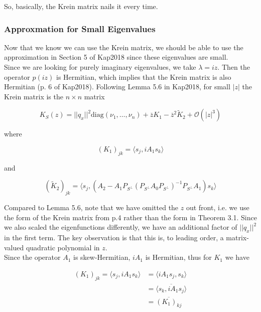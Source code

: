 \documentclass[12pt]{article}
\begin{document}
So, basically, the Krein matrix nails it every time.\\

\subsubsection{Approxmation for Small Eigenvalues}

Now that we know we can use the Krein matrix, we should be able to use the approximation in Section 5 of Kap2018 since these eigenvalues are small.\\

Since we are looking for purely imaginary eigenvalues, we take $\lambda = i z$. Then the operator $p(iz)$ is Hermitian, which implies that the Krein matrix is also Hermitian (p. 6 of Kap2018). Following Lemma 5.6 in Kap2018, for small $|z|$ the Krein matrix is the $n \times n$ matrix

\begin{equation}
K_S(z) = ||q_x||^2 \text{diag}(\nu_1, \dots, \nu_n) + \overline{z} K_1 - \overline{z}^2 \tilde{K}_2 + \mathcal{O}(|z|^3)
\end{equation}

where

\begin{equation}
(K_1)_{jk} = \langle s_j, i A_1 s_k \rangle
\end{equation}

and

\begin{equation}
(\tilde{K}_2)_{jk} = \langle s_j, (A_2 - A_1 P_{S^\perp} (P_{S^\perp} A_0 P_{S^\perp})^{-1} P_{S^\perp} A_1 ) s_k  \rangle
\end{equation}

Compared to Lemma 5.6, note that we have omitted the $z$ out front, i.e. we use the form of the Krein matrix from p.4 rather than the form in Theorem 3.1. Since we also scaled the eigenfunctions differently, we have an additional factor of $||q_x||^2$ in the first term. The key observation is that this is, to leading order, a matrix-valued quadratic polynomial in $z$.\\

Since the operator $A_1$ is skew-Hermitian, $i A_1$ is Hermitian, thus for $K_1$ we have

\begin{align*}
(K_1)_{jk} = \langle s_j, i A_1 s_k \rangle &= \langle i A_1 s_j, s_k \rangle \\
&= \overline{ \langle s_k, i A_1 s_j \rangle } \\
&= \overline{ (K_1)_{kj} }
\end{align*}
\end{document}
